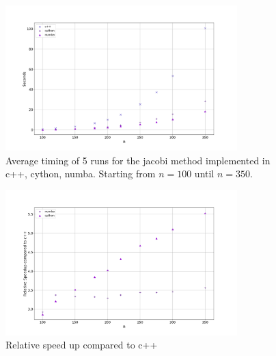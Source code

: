 \begin{figure}[H]
  \centering
  \includegraphics[width=0.8\textwidth]{../figures/speedComp_100_350.png}
  \caption{Average timing of 5 runs for the jacobi method implemented in c++, cython, numba. Starting from $n=100$ until $n=350$.}
  \label{fig:timing_largeN}
\end{figure}

\begin{figure}[H]
  \centering
  \includegraphics[width=0.8\textwidth]{../figures/speedCompC++_100_350.png}
  \caption{Relative speed up compared to c++}
  \label{fig:comp_c++}
\end{figure}
